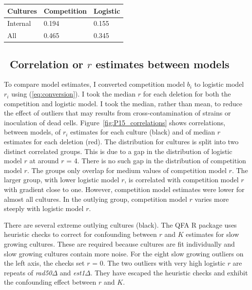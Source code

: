\begin{center}
  \begin{tabular}{l l l}
    \hline
    Cultures     & Competition & Logistic \\
    \hline
    Internal     & 0.194    & 0.155\\
    All          & 0.465    & 0.345\\
    \hline
  \end{tabular}
  \label{tab:P15_obj_fun}
\end{center}

\subsection{\boldmath \thesubsection~Correlation or \(r\) estimates between models \unboldmath}

To compare model estimates, I converted competition model \(b_{i}\) to
logistic model \(r_{i}\) using (\ref{eq:conversion}). I took the
median \(r\) for each deletion for both the competition and logistic
model. I took the median, rather than mean, to reduce the effect of
outliers that may results from cross-contamination of strains or
inoculation of dead cells. Figure~\ref{fig:P15_correlations} shows
correlations, between models, of \(r_{i}\) estimates for each culture
(black) and of median \(r\) estimates for each deletion (red). The
distribution for cultures is split into two distinct correlated
groups. This is due to a gap in the distribution of logistic model
\(r\) at around \(r\) = 4. There is no such gap in the distribution of
competition model \(r\). The groups only overlap for medium values of
competition model \(r\). The larger group, with lower logistic model
\(r\), is correlated with competition model \(r\) with gradient close
to one. However, competition model estimates were lower for almost all
cultures. In the outlying group, competition model \(r\) varies more
steeply with logistic model \(r\).

There are several extreme outlying cultures (black). The QFA R package
uses heuristic checks to correct for confounding between \(r\) and
\(K\) estimates for slow growing cultures. These are required because
cultures are fit individually and slow growing cultures contain more
noise. For the eight slow growing outliers on the left axis, the
checks set \(r\) = 0. The two outliers with very high logistic \(r\)
are repeats of \textit{rad50\(\Delta\)} and
\textit{est1\(\Delta\)}. They have escaped the heuristic checks and
exhibit the confounding effect between \(r\) and \(K\).

